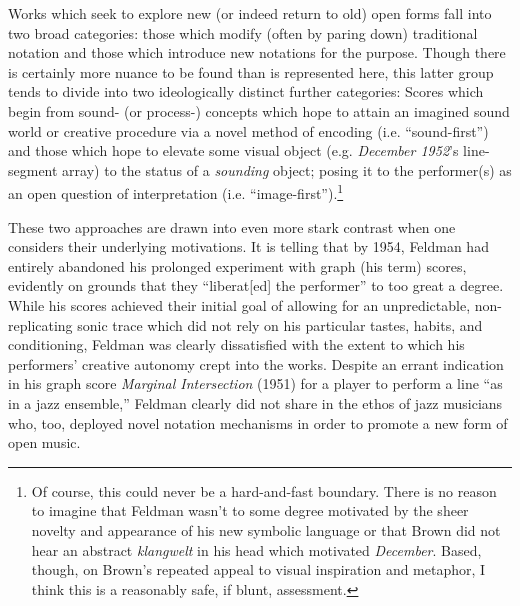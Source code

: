     Works which seek to explore new (or indeed return to old) open forms fall into two broad categories: those which modify (often by paring down) traditional notation and those which introduce new notations for the purpose. Though there is certainly more nuance to be found than is represented here, this latter group tends to divide into two ideologically distinct further categories: Scores which begin from sound- (or process-) concepts which hope to attain an imagined sound world or creative procedure via a novel method of encoding (i.e. ``sound-first'') and those which hope to elevate some visual object (e.g. \textit{December 1952}'s line-segment array) to the status of a \textit{sounding} object; posing it to the performer(s) as an open question of interpretation (i.e. ``image-first'').\footnote{Of course, this could never be a hard-and-fast boundary. There is no reason to imagine that Feldman wasn't to some degree motivated by the sheer novelty and appearance of his new symbolic language or that Brown did not hear an abstract \textit{klangwelt} in his head which motivated \textit{December}. Based, though, on Brown's repeated appeal to visual inspiration and metaphor, I think this is a reasonably safe, if blunt, assessment.} 

    These two approaches are drawn into even more stark contrast when one considers their underlying motivations. It is telling that by 1954, Feldman had entirely abandoned his prolonged experiment with graph (his term) scores, evidently on grounds that they ``liberat[ed] the performer'' to too great a degree. While his scores achieved their initial goal of allowing for an unpredictable, non-replicating sonic trace which did not rely on his particular tastes, habits, and conditioning, Feldman was clearly dissatisfied with the extent to which his performers' creative autonomy crept into the works.\autocite[99]{Taruskin_2009d} Despite an errant indication in his graph score \textit{Marginal Intersection} (1951) for a player to perform a line ``as in a jazz ensemble,'' Feldman clearly did not share in the ethos of jazz musicians who, too, deployed novel notation mechanisms in order to promote a new form of open music.\autocite{Dohoney_2017}

